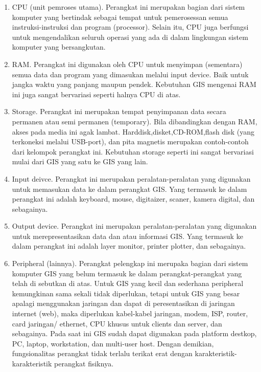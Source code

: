 \begin{enumerate}
\item CPU (unit pemroses utama). Perangkat ini merupakan bagian dari sistem komputer yang bertindak sebagai tempat untuk pemerosessan semua instruksi-instruksi dan program (processor). Selain itu, CPU juga berfungsi untuk mengendalikan seluruh operasi yang ada di dalam lingkungan sistem komputer yang bersangkutan. 

\item RAM. Perangkat ini digunakan oleh CPU untuk menyimpan (sementara) semua data dan program yang dimasukan melalui input device. Baik untuk jangka waktu yang panjang maupun pendek. Kebutuhan GIS mengenai RAM ini juga sangat bervariasi seperti halnya CPU di atas. 

\item Storage. Perangkat ini merupakan tempat penyimpanan data secara permanen atau semi permanen (temporary). Bila dibandingkan dengan RAM, akses pada media ini agak lambat. Harddisk,disket,CD-ROM,flash disk (yang terkoneksi melalui USB-port), dan pita magnetis merupakan contoh-contoh dari kelompok perangkat ini. Kebutuhan storage seperti ini sangat bervariasi mulai dari GIS yang satu ke GIS yang lain.

\item Input deivce. Perangkat ini merupakan peralatan-peralatan yang digunakan untuk memasukan data ke dalam perangkat GIS. Yang termasuk ke dalam perangkat ini adalah keyboard, mouse, digitaizer, scaner, kamera digital, dan sebagainya.

\item Output device. Perangkat ini merupakan peralatan-peralatan yang digunakan untuk merepresentasikan data dan atau informasi GIS. Yang termasuk ke dalam perangkat ini adalah layer monitor, printer plotter, dan sebagainya.

\item Peripheral (lainnya). Perangkat pelengkap ini merupaka bagian dari sistem komputer GIS yang belum termasuk ke dalam perangkat-perangkat yang telah di sebutkan di atas. Untuk GIS yang kecil dan sederhana peripheral kemungkinan sama sekali tidak diperlukan, tetapi untuk GIS yang besar apalagi menggunakan jaringan dan dapat di peresentasikan di jaringan internet (web), maka diperlukan kabel-kabel jaringan, modem, ISP, router, card jaringan/ ethernet, CPU khusus untuk clients dan server, dan sebagainya.
Pada saat ini GIS sudah dapat digunakan pada platform destkop, PC, laptop, workstation, dan multi-user host. Dengan demikian, fungsionalitas perangkat tidak terlalu terikat erat dengan karakteristik-karakteristik perangkat fisiknya. 

\end{enumerate}
